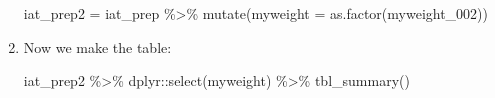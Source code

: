 \documentclass[
  letterpaper,
  DIV=11,
  numbers=noendperiod]{scrartcl}
\newenvironment{Shaded}{\begin{snugshade}}{\end{snugshade}}
\newcommand{\AttributeTok}[1]{\textcolor[rgb]{0.40,0.45,0.13}{#1}}
\newcommand{\FunctionTok}[1]{\textcolor[rgb]{0.28,0.35,0.67}{#1}}
\newcommand{\NormalTok}[1]{\textcolor[rgb]{0.00,0.23,0.31}{#1}}
\newcommand{\OtherTok}[1]{\textcolor[rgb]{0.00,0.23,0.31}{#1}}
\newcommand{\SpecialCharTok}[1]{\textcolor[rgb]{0.37,0.37,0.37}{#1}}
\begin{document}
\begin{enumerate}
\begin{Shaded}
\begin{Highlighting}[]
\NormalTok{iat\_prep2 }\OtherTok{=}\NormalTok{ iat\_prep }\SpecialCharTok{\%\textgreater{}\%} 
  \FunctionTok{mutate}\NormalTok{(}\AttributeTok{myweight =} \FunctionTok{as.factor}\NormalTok{(myweight\_002))}
\end{Highlighting}
\end{Shaded}
\item
  Now we make the table:

\begin{Shaded}
\begin{Highlighting}[]
\NormalTok{iat\_prep2 }\SpecialCharTok{\%\textgreater{}\%}
\NormalTok{  dplyr}\SpecialCharTok{::}\FunctionTok{select}\NormalTok{(myweight) }\SpecialCharTok{\%\textgreater{}\%}
  \FunctionTok{tbl\_summary}\NormalTok{()}
\end{Highlighting}
\end{Shaded}


\end{enumerate}
\end{document}
